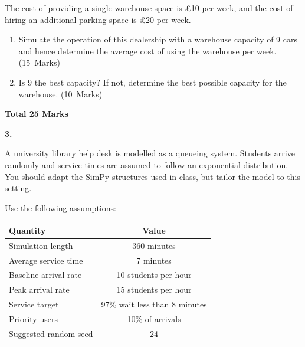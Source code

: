 \documentclass[11pt,a4paper]{article}
\newcommand{\markalloc}[1]{\nobreak\hfill\mbox{(#1 Marks)}}
\newcommand{\questiontotal}[1]{\begin{flushright}\textbf{Total #1 Marks}\end{flushright}}
\begin{document}
The cost of providing a single warehouse space is \pounds10 per week, and the cost of hiring an additional parking space is \pounds20 per week.

\begin{enumerate}
\item Simulate the operation of this dealership with a warehouse capacity of 9 cars and hence determine the average cost of using the warehouse per week. \markalloc{15}

\item Is 9 the best capacity? If not, determine the best possible capacity for the warehouse. \markalloc{10}
\end{enumerate}

\questiontotal{25}

\newpage

\textbf{3.}

A university library help desk is modelled as a queueing system.
Students arrive randomly and service times are assumed to follow an exponential distribution.
You should adapt the SimPy structures used in class, but tailor the model to this setting.

Use the following assumptions:

\begin{center}
\begin{tabular}{lc}
\toprule
Quantity & Value \\
\midrule
Simulation length & 360 minutes \\
Average service time & 7 minutes \\
Baseline arrival rate & 10 students per hour \\
Peak arrival rate & 15 students per hour \\
Service target & 97\% wait less than 8 minutes \\
Priority users & 10\% of arrivals \\
Suggested random seed & 24 \\
\bottomrule
\end{tabular}
\end{center}
\end{document}
